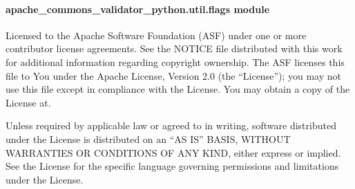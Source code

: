 \documentclass[letterpaper,10pt,english]{sphinxmanual}
\begin{document}
\paragraph{apache\_commons\_validator\_python.util.flags module}
\label{\detokenize{apache_commons_validator_python.util:module-apache_commons_validator_python.util.flags}}\label{\detokenize{apache_commons_validator_python.util:apache-commons-validator-python-util-flags-module}}
\sphinxAtStartPar
Licensed to the Apache Software Foundation (ASF) under one or more contributor
license agreements.  See the NOTICE file distributed with this work for additional
information regarding copyright ownership. The ASF licenses this file to You under the
Apache License, Version 2.0 (the “License”); you may not use this file except in
compliance with the License.  You may obtain a copy of the License at.

\sphinxAtStartPar
{}

\sphinxAtStartPar
Unless required by applicable law or agreed to in writing, software
distributed under the License is distributed on an “AS IS” BASIS,
WITHOUT WARRANTIES OR CONDITIONS OF ANY KIND, either express or implied.
See the License for the specific language governing permissions and
limitations under the License.
\end{document}

